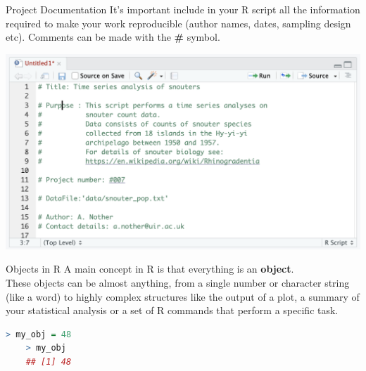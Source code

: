 \documentclass[aspectratio=169,xcolor=dvipsnames]{beamer}
\begin{document}
\begin{frame}{Project Documentation}
It's important include in your R script all the information required to make your work reproducible (author names, dates, sampling design etc). Comments can be made with the \textbf{\#} symbol. \\

\begin{center}
\includegraphics[scale=0.4]{images/documentation}
\end{center}
\end{frame}

\begin{frame}[fragile]{Objects in R}
A main concept in R is that everything is an \textbf{object}. \\
\vspace{0.5cm}
These objects can be almost anything, from a single number or character string (like a word) to highly complex structures like the output of a plot, a summary of your statistical analysis or a set of R commands that perform a specific task. \\

\begin{center}
\begin{lstlisting}[language=R]
    > my_obj = 48
    > my_obj
    ## [1] 48
    \end{lstlisting}
\end{center}

\end{frame}
\end{document}
